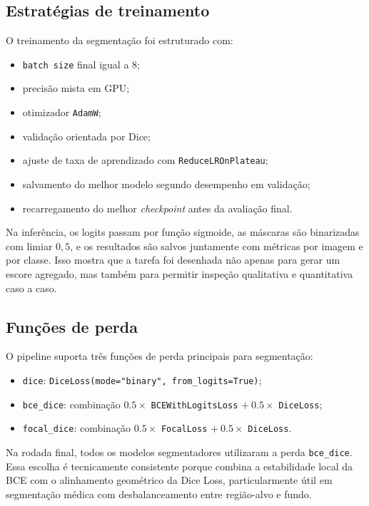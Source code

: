 \documentclass[tcc,capa]{texufpel}
\begin{document}
\subsection{Estratégias de treinamento}

O treinamento da segmentação foi estruturado com:
\begin{itemize}
	\item \texttt{batch size} final igual a 8;
	\item precisão mista em GPU;
	\item otimizador \texttt{AdamW};
	\item validação orientada por Dice;
	\item ajuste de taxa de aprendizado com \texttt{ReduceLROnPlateau};
	\item salvamento do melhor modelo segundo desempenho em validação;
	\item recarregamento do melhor \textit{checkpoint} antes da avaliação final.
\end{itemize}

Na inferência, os logits passam por função sigmoide, as máscaras são binarizadas com limiar \(0{,}5\), e os resultados são salvos juntamente com métricas por imagem e por classe. Isso mostra que a tarefa foi desenhada não apenas para gerar um escore agregado, mas também para permitir inspeção qualitativa e quantitativa caso a caso.

\subsection{Funções de perda}

O pipeline suporta três funções de perda principais para segmentação:
\begin{itemize}
	\item \texttt{dice}: \texttt{DiceLoss(mode="binary", from\_logits=True)};
	\item \texttt{bce\_dice}: combinação \(0.5 \times\) \texttt{BCEWithLogitsLoss} \(+\ 0.5 \times\) \texttt{DiceLoss};
	\item \texttt{focal\_dice}: combinação \(0.5 \times\) \texttt{FocalLoss} \(+\ 0.5 \times\) \texttt{DiceLoss}.
\end{itemize}

Na rodada final, todos os modelos segmentadores utilizaram a perda \texttt{bce\_dice}. Essa escolha é tecnicamente consistente porque combina a estabilidade local da BCE com o alinhamento geométrico da Dice Loss, particularmente útil em segmentação médica com desbalanceamento entre região-alvo e fundo.
\end{document}
